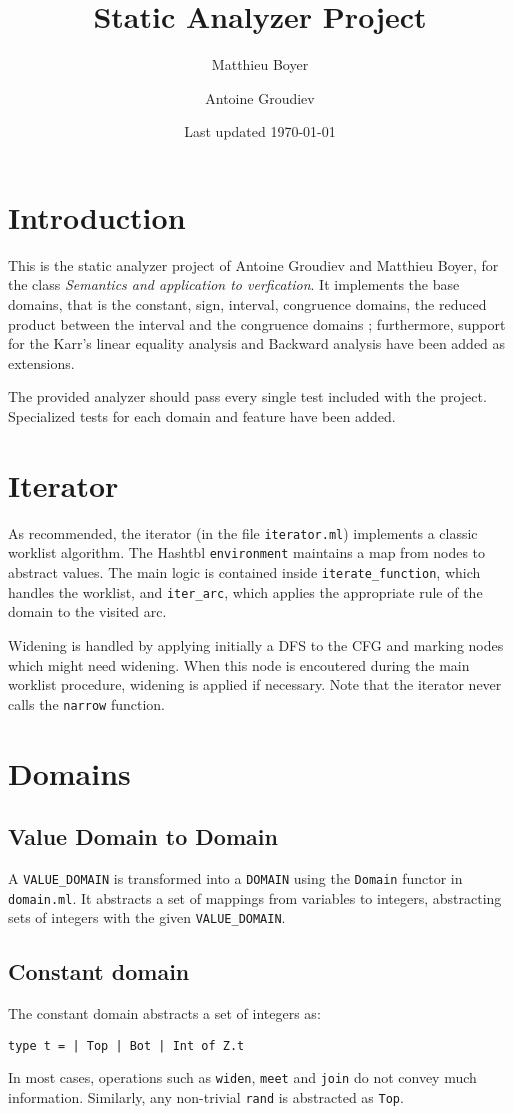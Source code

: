 \documentclass[12pt,a4paper]{article}
\title{\vspace{-5ex} \textbf{Static Analyzer Project}}
\author{Matthieu Boyer\and Antoine Groudiev}
\date{\vspace{-1ex}Last updated \today}
\begin{document}
\maketitle

\section*{Introduction}
This is the static analyzer project of Antoine Groudiev and Matthieu Boyer, for the class \emph{Semantics and application to verfication}. It implements the base domains, that is the constant, sign, interval, congruence domains, the reduced product between the interval and the congruence domains ; furthermore, support for the Karr’s linear equality analysis and Backward analysis have been added as extensions.

The provided analyzer should pass every single test included with the project. Specialized tests for each domain and feature have been added.

\section{Iterator}
As recommended, the iterator (in the file \texttt{iterator.ml}) implements a classic worklist algorithm. The Hashtbl \texttt{environment} maintains a map from nodes to abstract values. The main logic is contained inside \texttt{iterate\_function}, which handles the worklist, and \texttt{iter\_arc}, which applies the appropriate rule of the domain to the visited arc. 

Widening is handled by applying initially a DFS to the CFG and marking nodes which might need widening. When this node is encoutered during the main worklist procedure, widening is applied if necessary. Note that the iterator never calls the \texttt{narrow} function.

\section{Domains}
\subsection{Value Domain to Domain}
A \texttt{VALUE\_DOMAIN} is transformed into a \texttt{DOMAIN} using the \texttt{Domain} functor in \texttt{domain.ml}. It abstracts a set of mappings from variables to integers, abstracting sets of integers with the given \texttt{VALUE\_DOMAIN}.

\subsection{Constant domain}
The constant domain abstracts a set of integers as:
\begin{center}
    \texttt{type t = | Top | Bot | Int of Z.t}
\end{center}
In most cases, operations such as \texttt{widen}, \texttt{meet} and \texttt{join} do not convey much information. Similarly, any non-trivial \texttt{rand} is abstracted as \texttt{Top}.
\end{document}
